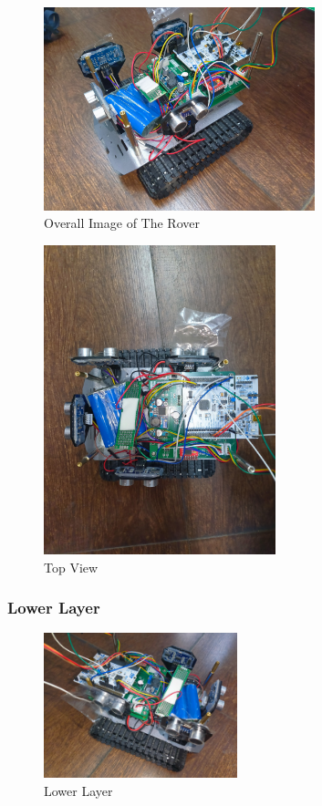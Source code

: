 \documentclass[12pt, a4paper, oneside]{report}
\begin{document}
\begin{figure}[H]
\centering
\includegraphics[width=0.7\textwidth]{pic/Hardware Design/Overall Image of The Rover.jpg}
\caption{Overall Image of The Rover}
\label{fig:Overall Image of The Rover}
\end{figure}
\begin{figure}[H]
\centering
\includegraphics[width=0.6\textwidth]{pic/Hardware Design/Top View.jpg}
\caption{Top View}
\label{fig:Top View}
\end{figure}
\subsubsection*{Lower Layer}
\begin{figure}[H]
\centering
\includegraphics[width=0.5\textwidth]{pic/Hardware Design/Lower Layer.jpg}
\caption{Lower Layer}
\label{fig:Lower Layer}
\end{figure}
\end{document}
